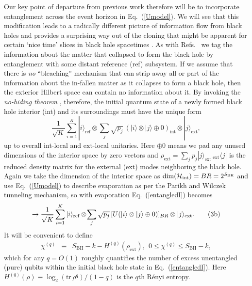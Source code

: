 \documentclass[aps,12pt]{revtex4}
\begin{document}
Our key point of departure from previous work \cite{Page93,Hayden07}
therefore will be to incorporate entanglement across the event horizon
in Eq.~(\ref{Umodel}). We will see that this modification leads to a
radically different picture of information flow from black holes and
provides a surprising way out of the cloning \cite{Susskind93} that might
be apparent for certain `nice time' slices in black hole
spacetimes \cite{Lowe95}. As with Refs.~ we tag
the information about the matter that collapsed to form the black hole
by entanglement with some distant reference (ref) subsystem. If we
assume that there is {\it no\/} ``bleaching'' mechanism that can strip
away all or part of the information about the in-fallen matter as
it collapses to form a black hole, then the exterior Hilbert space
can contain no information about it. By invoking the
{\it no-hiding theorem} \cite{me}, therefore, the initial quantum state
of a newly formed black hole interior (int) and its surroundings must
have the unique form
\begin{equation}
\frac{1}{\sqrt{K}}\sum_{i=1}^K |i\rangle_{\text{ref}}\otimes
\sum_{j}\sqrt{p_j}\,(|i\rangle\otimes |j\rangle\oplus 0)_{\text{int}}
\otimes|j\rangle_{\text{ext}}, \tag{3a} \label{entangledI}
\end{equation}
up to overall int-local and ext-local unitaries.
Here $\oplus 0$ means we pad any unused dimensions of the interior
space by zero vectors \cite{me} and
$\rho_{\text{ext}}=\sum_jp_j|j\rangle_{\text{ext}}%
\,{}_{\text{ext}}\!\langle j|$
is the reduced density matrix for the external (ext) modes neighboring 
the black hole. Again we take the dimension of the interior space as
$\text{dim}({\cal H}_\text{int})= BR= 2^{S_{\text{BH}}}$ and use
Eq.~(\ref{Umodel}) to describe evaporation as per the Parikh and Wilczek
tunneling mechanism, so with evaporation Eq.~(\ref{entangledI}) becomes
\begin{equation}
\rightarrow
\frac{1}{\sqrt{K}}\sum_{i=1}^K |i\rangle_{\text{ref}}\otimes
\!\sum_{j}\sqrt{p_j}\,[U(|i\rangle\otimes |j\rangle\oplus 0)]_{BR}
\otimes|j\rangle_{\text{ext}}.
\tag{3b} \label{entangledF}
\setcounter{equation}{3}
\end{equation}
It will be convenient to define
\begin{eqnarray}
\!\!\!\!\!\!\!\!
\chi^{(q)}\!\!&\equiv&\!\! S_{\text{BH}} - k -H^{(q)}(\rho_{\text{ext}}),~~
0\le \chi^{(q)} \le S_{\text{BH}}-k,
\end{eqnarray}
which for any $q=O(1)$ roughly quantifies the number of excess
unentangled (pure) qubits within the initial black hole state in
Eq.~(\ref{entangledI}). Here
$H^{(q)}(\rho) \equiv \log_2({\text{tr}}\, \rho^q)/(1-q)$ is the $q$th
R\'enyi entropy.
\end{document}

